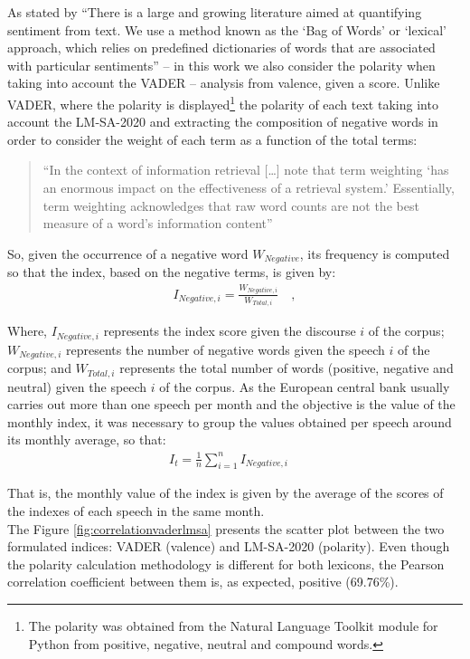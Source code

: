 As stated by \cite[p. 13]{shapiro2021taking} ``There is a large and growing literature aimed at quantifying sentiment from text. We use a method known as the `Bag of Words' or `lexical' approach, which relies on predefined dictionaries of words that are associated with particular sentiments'' -- in this work we also consider the polarity when taking into account the VADER -- analysis from valence, given a score. Unlike VADER, where the polarity is displayed\footnote{The polarity was obtained from the Natural Language Toolkit \cite[]{bird2009natural} module for Python from positive, negative, neutral and compound words.} the polarity of each text taking into account the LM-SA-2020 and extracting the composition of negative words in order to consider the weight of each term as a function of the total terms:

\begin{quote}
``In the context of information retrieval [\dots] note that term weighting `has an enormous impact on the effectiveness of a retrieval system.' Essentially, term weighting acknowledges that raw word counts are not the
best measure of a word’s information content''\cite[p. 42]{shapiro2020measuring}  
\end{quote}
So, given the occurrence of a negative word $W_{Negative}$, its frequency is computed so that the index, based on the negative terms, is given by:
\begin{align*}
I_{Negative, i} = \frac{W_{Negative, i}}{W_{Total, i}} \quad ,
\end{align*}

Where, $I_{Negative, i}$ represents the index score given the discourse $i$ of the corpus; $W_{Negative, i}$ represents the number of negative words given the speech $i$ of the corpus; and $W_{Total, i}$ represents the total number of words (positive, negative and neutral) given the speech $i$ of the corpus. As the European central bank usually carries out more than one speech per month and the objective is the value of the monthly index, it was necessary to group the values obtained per speech around its monthly average, so that:
\begin{align*}
    I_{t} = \frac{1}{n}\sum_{i=1}^{n}I_{Negative,i} \quad
\end{align*}

That is, the monthly value of the index is given by the average of the scores of the indexes of each speech in the same month.\\

The Figure \ref{fig:correlationvaderlmsa} presents the scatter plot between the two formulated indices: VADER (valence) and LM-SA-2020 (polarity). Even though the polarity calculation methodology is different for both lexicons, the Pearson correlation coefficient between them is, as expected, positive (69.76\%).

